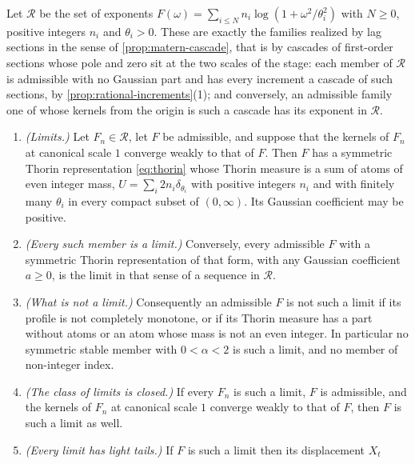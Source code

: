 \begin{proposition}\label{prop:rational-closure}
Let $\mathcal{R}$ be the set of exponents
$F(\omega) = \sum_{i \le N} n_i\log(1 + \omega^2/\theta_i^2)$ with $N \ge 0$, positive integers
$n_i$ and $\theta_i > 0$. These are exactly the families realized by lag sections in the sense of
\ref{prop:matern-cascade}, that is by cascades of first-order sections whose pole and zero sit at
the two scales of the stage: each member of $\mathcal{R}$ is admissible
with no Gaussian part and has every increment a cascade of such sections, by
\ref{prop:rational-increments}(1); and conversely, an admissible family one of whose kernels from
the origin is such a cascade has its exponent in $\mathcal{R}$.
\begin{enumerate}
\item \emph{(Limits.)} Let $F_n \in \mathcal{R}$, let $F$ be admissible, and suppose that the
kernels of $F_n$ at canonical scale $1$ converge weakly to that of $F$. Then $F$ has a symmetric
Thorin representation \ref{eq:thorin} whose Thorin measure is a sum of atoms of even integer
mass, $U = \sum_i 2n_i\delta_{\theta_i}$ with positive integers $n_i$ and with finitely many
$\theta_i$ in every compact subset of $(0,\infty)$. Its Gaussian coefficient may be positive.
\item \emph{(Every such member is a limit.)} Conversely, every admissible $F$ with a symmetric
Thorin representation of that form, with any Gaussian coefficient $a \ge 0$, is the limit in
that sense of a sequence in $\mathcal{R}$.
\item \emph{(What is not a limit.)} Consequently an admissible $F$ is not such a limit if its
profile is not completely monotone, or if its Thorin measure has a part without atoms or an
atom whose mass is not an even integer. In particular no symmetric stable member with
$0 < \alpha < 2$ is such a limit, and no \Matern{} member of non-integer index.
\item \emph{(The class of limits is closed.)} If every $F_n$ is such a limit, $F$ is admissible,
and the kernels of $F_n$ at canonical scale $1$ converge weakly to that of $F$, then $F$ is such
a limit as well.
\item \emph{(Every limit has light tails.)} If $F$ is such a limit then its displacement $X_t$

\end{enumerate}
\end{proposition}
